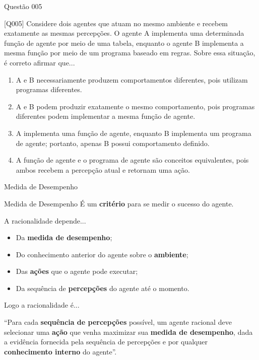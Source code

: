 \documentclass[xcolor=dvipsnames,table]{beamer}
\begin{document}
	\begin{frame}{Questão 005} 
		\footnotesize
		\begin{block}{[Q005]} 
			Considere dois agentes que atuam no mesmo ambiente e recebem exatamente as mesmas percepções. O agente A implementa uma determinada função de agente por meio de uma tabela, enquanto o agente B implementa a mesma função por meio de um programa baseado em regras. Sobre essa situação, é correto afirmar que... 
		\end{block} 
		\begin{enumerate}[label=(\Alph*)] 
			\item A e B necessariamente produzem comportamentos diferentes, pois utilizam programas diferentes. 
			\item A e B podem produzir exatamente o mesmo comportamento, pois programas diferentes podem implementar a mesma função de agente. 
			\item A implementa uma função de agente, enquanto B implementa um programa de agente; portanto, apenas B possui comportamento definido. 
			\item A função de agente e o programa de agente são conceitos equivalentes, pois ambos recebem a percepção atual e retornam uma ação. 
		\end{enumerate} 
	\end{frame}


        \begin{frame}{Medida de Desempenho}
		\begin{block}{Medida de Desempenho}
			É um {\color{blue} \bf critério} para se medir o sucesso do agente.
		\end{block}	\pause
		\begin{block}{A racionalidade depende...}
			\begin{itemize}						
				\item Da {\color{blue} \bf medida de desempenho};
 				\item Do conhecimento anterior do agente sobre o {\color{blue} \bf ambiente};
 				\item Das {\color{blue} \bf ações} que o agente pode executar;
 				\item Da sequência de {\color{blue} \bf percepções} do agente até o momento.
			\end{itemize}
		\end{block}
	\end{frame}
	
	\begin{frame}{Logo a racionalidade é...}
		\begin{block}{}
			``Para cada {\color{blue} \bf sequência de percepções} possível, um agente racional deve selecionar uma {\color{blue} \bf ação} que venha maximizar sua {\color{blue} \bf medida de desempenho}, dada a evidência fornecida pela sequência de percepções e por qualquer {\color{blue} \bf conhecimento interno} do agente''.
		\end{block}
	\end{frame}
\end{document}
